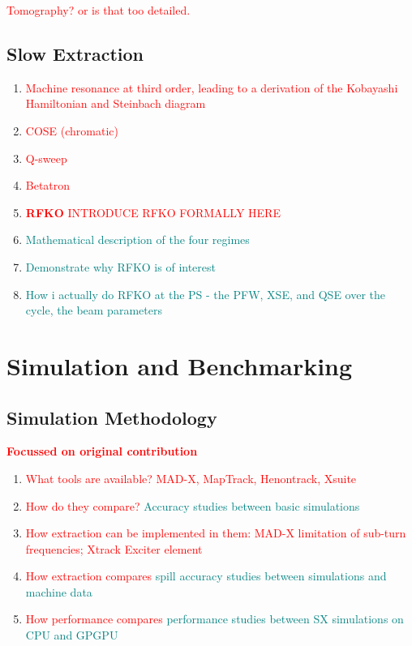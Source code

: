 \documentclass[11pt]{report}
\newcommand\todo[1]{\textcolor{red}{#1}}
\begin{document}
\todo{Tomography? or is that too detailed.}

\section{Slow Extraction}

\begin{enumerate}
  \item \todo{Machine resonance at third order, leading to a derivation of the Kobayashi Hamiltonian and Steinbach diagram}
  \item \todo{COSE (chromatic)}
  \item \todo{Q-sweep}
  \item \todo{Betatron}
  \item \todo{\textbf{RFKO} INTRODUCE RFKO FORMALLY HERE}
  \item \textcolor{teal}{Mathematical description of the four regimes}
  
  \item \textcolor{teal}{Demonstrate why RFKO is of interest}
  \item \textcolor{teal}{How i actually do RFKO at the PS - the PFW, XSE, and QSE over the cycle, the beam parameters}
\end{enumerate}


\chapter{Simulation and Benchmarking}
\section{Simulation Methodology}
\todo{\textbf{Focussed on original contribution}}
\begin{enumerate}
    \item \todo{What tools are available? MAD-X, MapTrack, Henontrack, Xsuite}
    \item \todo{How do they compare?} \textcolor{teal}{Accuracy studies between basic simulations}
    \item \todo{How extraction can be implemented in them: MAD-X limitation of sub-turn frequencies; Xtrack Exciter element}
    \item \todo{How extraction compares} \textcolor{teal}{spill accuracy studies between simulations and machine data}
    \item \todo{How performance compares} \textcolor{teal}{performance studies between SX simulations on CPU and GPGPU}
\end{enumerate}
\end{document}
